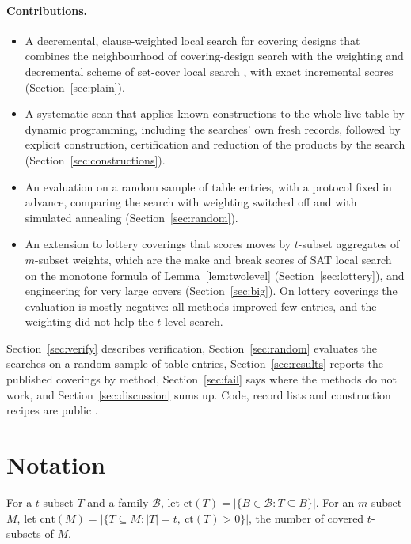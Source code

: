 \documentclass[11pt]{article}
\theoremstyle{remark}
\newcommand{\cov}{\mathrm{ct}}
\newcommand{\cnt}{\mathrm{cnt}}
\begin{document}
\paragraph{Contributions.}
\begin{itemize}
\item A decremental, clause-weighted local search for covering designs that combines the neighbourhood of covering-design
search \cite{nurmela1993,fadlaoui2011} with the weighting and decremental scheme of set-cover local search
\cite{rwls2015}, with exact incremental scores (Section~\ref{sec:plain}).
\item A systematic scan that applies known constructions \cite{gkp1995,montecalvo2012} to the whole live table by
dynamic programming, including the searches' own fresh records, followed by explicit construction, certification and
reduction of the products by the search (Section~\ref{sec:constructions}).
\item An evaluation on a random sample of table entries, with a protocol fixed in advance, comparing the search with
weighting switched off and with simulated annealing (Section~\ref{sec:random}).
\item An extension to lottery coverings that scores moves by $t$-subset aggregates of $m$-subset weights, which are
the make and break scores of SAT local search on the monotone formula of Lemma~\ref{lem:twolevel}
(Section~\ref{sec:lottery}), and engineering for very large covers (Section~\ref{sec:big}). On lottery coverings the
evaluation is mostly negative: all methods improved few entries, and the weighting did not help the $t$-level search.
\end{itemize}
Section~\ref{sec:verify} describes verification, Section~\ref{sec:random} evaluates the searches on a random
sample of table entries, Section~\ref{sec:results} reports the published coverings by method, Section~\ref{sec:fail}
says where the methods do not work, and Section~\ref{sec:discussion} sums up. Code, record lists and
construction recipes are public \cite{repo}.

\section{Notation}

For a $t$-subset $T$ and a family $\mathcal{B}$, let $\cov(T)=|\{B\in\mathcal{B}:T\subseteq B\}|$. For an
$m$-subset $M$, let $\cnt(M)=|\{T\subseteq M:|T|=t,\ \cov(T)>0\}|$, the number of covered $t$-subsets of $M$.
\end{document}
